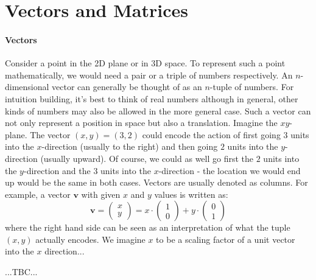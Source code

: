 \section{Vectors and Matrices}

\paragraph{Vectors}
Consider a point in the 2D plane or in 3D space. To represent such a point mathematically, we would need a pair or a triple of numbers respectively. An $n$-dimensional vector can generally be thought of as an $n$-tuple of numbers. For intuition building, it's best to think of real numbers although in general, other kinds of numbers may also be allowed in the more general case. Such a vector can not only represent a position in space but also a translation. Imagine the $xy$-plane. The vector $(x,y) = (3,2)$ could encode the action of first going $3$ units into the $x$-direction (usually to the right) and then going $2$ units into the $y$-direction (usually upward). Of course, we could as well go first the $2$ units into the $y$-direction and the $3$ units into the $x$-direction - the location we would end up would be the same in both cases. Vectors are usually denoted as columns. For example, a vector $\mathbf{v}$ with given $x$ and $y$ values is written as:
\begin{equation}
\mathbf{v} 
= \begin{pmatrix} x \\ y \end{pmatrix} 
=   x \cdot \begin{pmatrix} 1 \\ 0 \end{pmatrix} 
  + y \cdot \begin{pmatrix} 0 \\ 1 \end{pmatrix} 
\end{equation}
where the right hand side can be seen as an interpretation of what the tuple $(x,y)$ actually encodes. We imagine $x$ to be a scaling factor of a unit vector into the $x$ direction...

...TBC...





